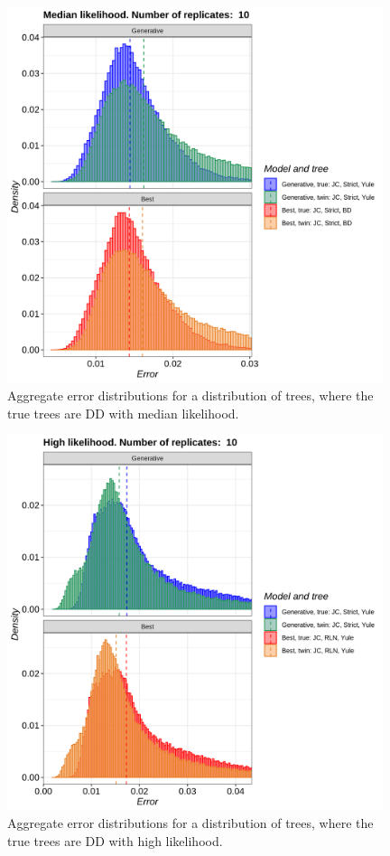 \begin{figure}[H]
  \includegraphics[width=0.98\textwidth]{pirouette_example_23/errors_mid.png}
  \caption{Aggregate error distributions for a distribution of trees, where the true trees are DD with median likelihood.}
\end{figure}

\begin{figure}[H]
  \includegraphics[width=0.98\textwidth]{pirouette_example_23/errors_high.png}
  \caption{Aggregate error distributions for a distribution of trees, where the true trees are DD with high likelihood.}
\end{figure}

